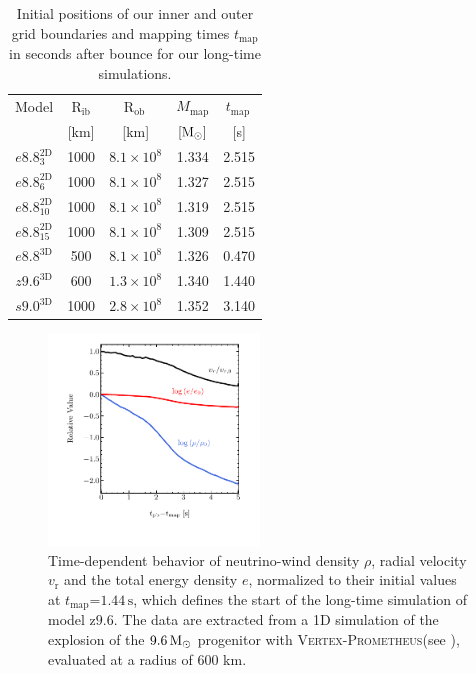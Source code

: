 \documentclass[fleqn,usenatbib]{mnras}
\newcommand{\solm}{\ensuremath{\rm{M_{\odot}}}\xspace}
\newcommand{\s}{\ensuremath{\text{s}}}
\newcommand{\vertexprom}{\textsc{Vertex-Prometheus}\xspace}
\newcommand{\znine}{\ensuremath{\mathrm{z9.6}}\xspace}
\begin{document}
\begin{table} %
 \centering
 \caption{Initial positions of our inner and outer grid boundaries 
 and mapping times $t_\mathrm{map}$ in seconds 
 after bounce for our long-time simulations. }
\label{tab:long term boundaries}
\begin{tabular}{ccccc}
  \hline
 Model & $\mathrm{R_{ib}}$ & $\mathrm{R_{ob}\,}$ & $M_{\mathrm{map}}$ &  $t_{\mathrm{map}}\,$   \\
       & [km] & [km] & $[\solm]$ & [s]  \\
  \hline
 $e8.8^{\mathrm{2D}}_{3}$  & 1000 & $8.1\times10^{8}$ & 1.334 & 2.515 \\
 $e8.8^{\mathrm{2D}}_{6}$  & 1000 & $8.1\times10^{8}$ & 1.327 & 2.515 \\
 $e8.8^{\mathrm{2D}}_{10}$ & 1000 & $8.1\times10^{8}$ & 1.319 & 2.515 \\
 $e8.8^{\mathrm{2D}}_{15}$ & 1000 & $8.1\times10^{8}$ & 1.309 & 2.515 \\
 $e8.8^{\mathrm{3D}}$      & 500  & $8.1\times10^{8}$ & 1.326 & 0.470 \\
 $z9.6^{\mathrm{3D}}$      & 600  & $1.3\times10^{8}$ & 1.340 & 1.440 \\
 $s9.0^{\mathrm{3D}}$      & 1000  & $2.8\times10^{8}$ & 1.352 & 3.140 \\
  \hline
\end{tabular}
\end{table} %
\begin{figure} %
\label{fig:wind}
 \centering
 \includegraphics[width=0.50\textwidth,trim=0.2cm 1.1cm 0.2cm 0.2cm,clip]{./pic/wind_paper.pdf}
 \caption{Time-dependent behavior of neutrino-wind density $\rho$, radial velocity $v_{\mathrm{r}}$ and the total energy density $e$, normalized to their initial values at $t_{\mathrm{map}}\mathord{=}1.44\,\s$, which defines the start of the long-time simulation of model \znine. The data are extracted from a 1D simulation of the explosion of the $9.6\,\solm$ progenitor with \vertexprom (see \citealt{Mirizzi2016}), evaluated at a radius of 600 km. }
\end{figure}%
\end{document}
